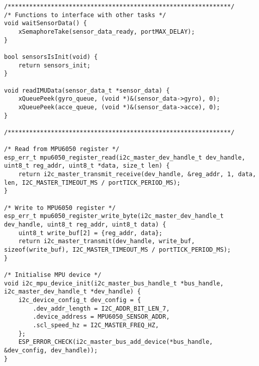 \begin{lstlisting}[caption={Register Read}]
/**************************************************************/
/* Functions to interface with other tasks */
void waitSensorData() { 
    xSemaphoreTake(sensor_data_ready, portMAX_DELAY);
}

bool sensorsIsInit(void) {
    return sensors_init;
}

void readIMUData(sensor_data_t *sensor_data) {
    xQueuePeek(gyro_queue, (void *)&(sensor_data->gyro), 0);
    xQueuePeek(acce_queue, (void *)&(sensor_data->acce), 0);
}

/**************************************************************/

/* Read from MPU6050 register */
esp_err_t mpu6050_register_read(i2c_master_dev_handle_t dev_handle, uint8_t reg_addr, uint8_t *data, size_t len) {
    return i2c_master_transmit_receive(dev_handle, &reg_addr, 1, data, len, I2C_MASTER_TIMEOUT_MS / portTICK_PERIOD_MS);
}

/* Write to MPU6050 register */
esp_err_t mpu6050_register_write_byte(i2c_master_dev_handle_t dev_handle, uint8_t reg_addr, uint8_t data) {
    uint8_t write_buf[2] = {reg_addr, data};
    return i2c_master_transmit(dev_handle, write_buf, sizeof(write_buf), I2C_MASTER_TIMEOUT_MS / portTICK_PERIOD_MS);
}

/* Initialise MPU device */
void i2c_mpu_device_init(i2c_master_bus_handle_t *bus_handle, i2c_master_dev_handle_t *dev_handle) {
    i2c_device_config_t dev_config = {
        .dev_addr_length = I2C_ADDR_BIT_LEN_7,
        .device_address = MPU6050_SENSOR_ADDR,
        .scl_speed_hz = I2C_MASTER_FREQ_HZ,
    };
    ESP_ERROR_CHECK(i2c_master_bus_add_device(*bus_handle, &dev_config, dev_handle));
}
\end{lstlisting}
